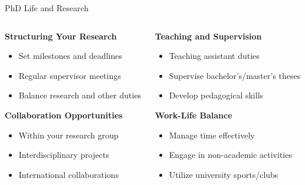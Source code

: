 \documentclass[aspectratio=169,10pt]{beamer}
\begin{document}
\begin{frame}{PhD Life and Research}
    \begin{columns}[T]
        \begin{column}{0.5\textwidth}
            \textbf{Structuring Your Research}
            \begin{itemize}
                \item Set milestones and deadlines
                \item Regular supervisor meetings
                \item Balance research and other duties
            \end{itemize}
            
            \textbf{Collaboration Opportunities}
            \begin{itemize}
                \item Within your research group
                \item Interdisciplinary projects
                \item International collaborations
            \end{itemize}
        \end{column}
        \begin{column}{0.5\textwidth}
            \textbf{Teaching and Supervision}
            \begin{itemize}
                \item Teaching assistant duties
                \item Supervise bachelor's/master's theses
                \item Develop pedagogical skills
            \end{itemize}
            
            \textbf{Work-Life Balance}
            \begin{itemize}
                \item Manage time effectively
                \item Engage in non-academic activities
                \item Utilize university sports/clubs
            \end{itemize}
        \end{column}
    \end{columns}
\end{frame}
\end{document}
